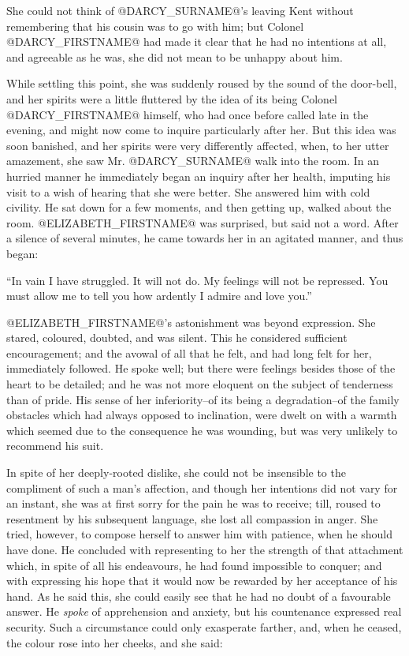 She could not think of @DARCY_SURNAME@'s leaving Kent without remembering that
his cousin was to go with him; but Colonel @DARCY_FIRSTNAME@ had made it clear
that he had no intentions at all, and agreeable as he was, she did not
mean to be unhappy about him.

While settling this point, she was suddenly roused by the sound of the
door-bell, and her spirits were a little fluttered by the idea of its
being Colonel @DARCY_FIRSTNAME@ himself, who had once before called late in
the evening, and might now come to inquire particularly after her.
But this idea was soon banished, and her spirits were very differently
affected, when, to her utter amazement, she saw Mr. @DARCY_SURNAME@ walk into the
room. In an hurried manner he immediately began an inquiry after her
health, imputing his visit to a wish of hearing that she were better.
She answered him with cold civility. He sat down for a few moments, and
then getting up, walked about the room. @ELIZABETH_FIRSTNAME@ was surprised, but
said not a word. After a silence of several minutes, he came towards her
in an agitated manner, and thus began:

``In vain I have struggled. It will not do. My feelings will not be
repressed. You must allow me to tell you how ardently I admire and love
you.''

@ELIZABETH_FIRSTNAME@'s astonishment was beyond expression. She stared, coloured,
doubted, and was silent. This he considered sufficient encouragement;
and the avowal of all that he felt, and had long felt for her,
immediately followed. He spoke well; but there were feelings besides
those of the heart to be detailed; and he was not more eloquent on the
subject of tenderness than of pride. His sense of her inferiority--of
its being a degradation--of the family obstacles which had always
opposed to inclination, were dwelt on with a warmth which seemed due to
the consequence he was wounding, but was very unlikely to recommend his
suit.

In spite of her deeply-rooted dislike, she could not be insensible to
the compliment of such a man's affection, and though her intentions did
not vary for an instant, she was at first sorry for the pain he was to
receive; till, roused to resentment by his subsequent language, she
lost all compassion in anger. She tried, however, to compose herself to
answer him with patience, when he should have done. He concluded with
representing to her the strength of that attachment which, in spite
of all his endeavours, he had found impossible to conquer; and with
expressing his hope that it would now be rewarded by her acceptance of
his hand. As he said this, she could easily see that he had no doubt
of a favourable answer. He \textit{spoke} of apprehension and anxiety, but
his countenance expressed real security. Such a circumstance could
only exasperate farther, and, when he ceased, the colour rose into her
cheeks, and she said:

